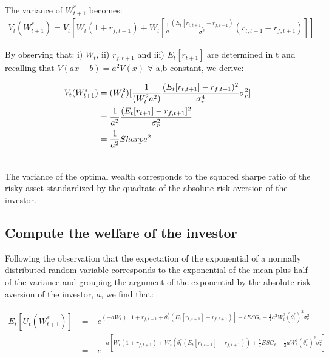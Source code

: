 \documentclass[12pt]{article}
\begin{document}
	The variance of $W_{t+1}^{*}$ becomes: \vspace{-0.5em}
	\begin{align*}
		V_{t}(W_{t+1}^{*}) = V_{t}[W_t(1 + r_{f,t+1}) + W_t[\frac{1}{a}\frac{(E_{t}[r_{t,t+1}]-r_{f, t+1})}{\sigma_r^{2}}(r_{t,t+1}-r_{f, t+1})]]
	\end{align*} \vspace{-1.75em}
	
	By observing that: i) $W_t$, ii) $r_{f,t+1}$ and iii) $E_{t}[r_{t+1}]$ are determined in t and recalling that $V(ax + b) = a^2V(x)$ $\forall$ a,b constant, we derive: \vspace{-1.25em}
	
	\begin{align} %
		V_{t}(W_{t+1}^{*}) &= (W_t^2)[\frac{1}{(W_t^2a^2)}\frac{(E_{t}[r_{t,t+1}]-r_{f, t+1})^2}{\sigma_r^4}\sigma_r^2] \notag \\
		&=\frac{1}{a^2}\frac{(E_{t}[r_{t+1}]-r_{f, t+1}]^2}{\sigma_r^2} \notag\\
		&= \frac{1}{a^2}Sharpe^2 \\	\notag
	\end{align}  \vspace{-3em}
	
	The variance of the optimal wealth corresponds to the squared sharpe ratio of the risky asset standardized by the quadrate of the absolute risk aversion of the investor.
	
	\subsection{Compute the welfare of the investor}
	
	Following the observation that the expectation of the exponential of a normally distributed random variable corresponds to the exponential of the mean plus half of the variance and grouping the argument of the exponential by the absolute risk aversion of the investor, $a$, we find that: \vspace{-1.5em}
	
	\begin{align*}
		E_t[U_{t}(W_{t+1}^{*})] &= -e^{(-aW_t) [1 + r_{f,t+1} + \theta_t^*(E_{t}[r_{t,t+1}]-r_{f, t+1})] - bESG_t + \frac{1}{2}a^2W_t^2(\theta_t^{*})^2\sigma_r^2} \\
		&= -e^{-a [W_t(1 + r_{f,t+1}) + W_t(\theta_t^*(E_{t}[r_{t,t+1}]-r_{f, t+1})) + \frac{b}{a}ESG_t - \frac{1}{2}aW_t^2(\theta_t^{*})^2\sigma_r^2]}
	\end{align*} \vspace{-2em}
	
\end{document}

